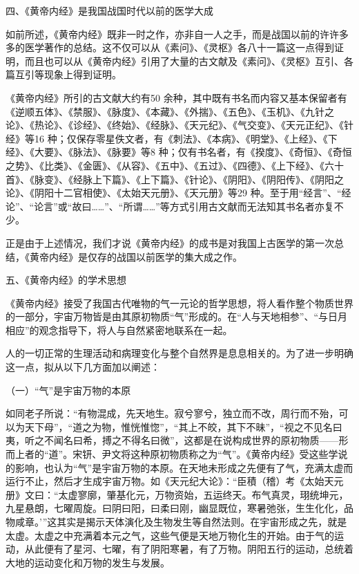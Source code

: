 \documentclass[a4paper,12pt,UTF8,twoside]{ctexbook}
\begin{document}
	四、《黄帝内经》是我国战国时代以前的医学大成
	
	如前所述，《黄帝内经》既非一时之作，亦非自一人之手，而是战国以前的许许多多的医学著作的总结。这不仅可以从《素问》、《灵枢》各八十一篇这一点得到证明，而且也可以从《黄帝内经》引用了大量的古文献及《素问》、《灵枢》互引、各篇互引等现象上得到证明。
	
	《黄帝内经》所引的古文献大约有50 余种，其中既有书名而内容又基本保留者有《逆顺五体》、《禁服》、《脉度》、《本藏》、《外揣》、《五色》、《玉机》、《九针之论》、《热论》、《诊经》、《终始》、《经脉》、《天元纪》、《气交变》、《天元正纪》、《针经》等16 种；仅保存零星佚文者，有《刺法》、《本病》、《明堂》、《上经》、《下经》、《大要》、《脉法》、《脉要》等8 种；仅有书名者，有《揆度》、《奇恒》、《奇恒之势》、《比类》、《金匮》、《从容》、《五中》、《五过》、《四德》、《上下经》、《六十首》、《脉变》、《经脉上下篇》、《上下篇》、《针论》、《阴阳》、《阴阳传》、《阴阳之论》、《阴阳十二官相使》、《太始天元册》、《天元册》等29 种。至于用“经言”、“经论”、“论言”或“故曰……”、“所谓……”等方式引用古文献而无法知其书名者亦复不少。
	
	正是由于上述情况，我们才说《黄帝内经》的成书是对我国上古医学的第一次总结，《黄帝内经》是仅存的战国以前医学的集大成之作。
	
	五、《黄帝内经》的学术思想
	
	《黄帝内经》接受了我国古代唯物的气一元论的哲学思想，将人看作整个物质世界的一部分，宇宙万物皆是由其原初物质“气”形成的。在“人与天地相参”、“与日月相应”的观念指导下，将人与自然紧密地联系在一起。
	
	人的一切正常的生理活动和病理变化与整个自然界是息息相关的。为了进一步明确这一点，拟从以下几方面加以阐述：
	
	（一）“气”是宇宙万物的本原
	
	如同老子所说：“有物混成，先天地生。寂兮寥兮，独立而不改，周行而不殆，可以为天下母”，“道之为物，惟恍惟惚”，“其上不皎，其下不昧”，“视之不见名曰夷，听之不闻名曰希，搏之不得名曰微”，这都是在说构成世界的原初物质——形而上者的“道”。宋钘、尹文将这种原初物质称之为“气”。《黄帝内经》受这些学说的影响，也认为“气”是宇宙万物的本原。在天地未形成之先便有了气，充满太虚而运行不止，然后才生成宇宙万物。如《天元纪大论》：“臣積（稽）考《太始天元册》文曰：“太虚寥廓，肇基化元，万物资始，五运终天。布气真灵，珝统坤元，九星悬朗，七曜周旋。曰阴曰阳，曰柔曰刚，幽显既位，寒暑弛张，生生化化，品物咸章。’”这其实是揭示天体演化及生物发生等自然法则。在宇宙形成之先，就是太虚。太虚之中充满着本元之气，这些气便是天地万物化生的开始。由于气的运动，从此便有了星河、七曜，有了阴阳寒暑，有了万物。阴阳五行的运动，总统着大地的运动变化和万物的发生与发展。
	
\end{document}
